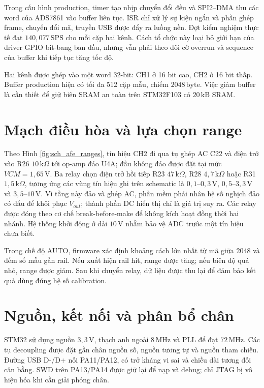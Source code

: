 \documentclass[12pt,a4paper]{report}
\newcommand{\unit}[1]{\,\mathrm{#1}}
\begin{document}
Trong cấu hình production, timer tạo nhịp chuyển đổi đều và SPI2--DMA thu các word của ADS7861 vào buffer liên tục. ISR chỉ xử lý sự kiện ngắn và phần ghép frame, chuyển đổi mã, truyền USB được đẩy ra luồng nền. Đợt kiểm nghiệm thực tế đạt $140{,}077\unit{SPS}$ cho mỗi cặp hai kênh. Cách tổ chức này loại bỏ giới hạn của driver GPIO bit-bang ban đầu, nhưng vẫn phải theo dõi cờ overrun và sequence của buffer khi tiếp tục tăng tốc độ.

Hai kênh được ghép vào một word 32-bit: CH1 ở 16 bit cao, CH2 ở 16 bit thấp. Buffer production hiện có tối đa 512 cặp mẫu, chiếm $2048\unit{byte}$. Việc giảm buffer là cần thiết để giữ biên SRAM an toàn trên STM32F103 có $20\unit{kB}$ SRAM.

\section{Mạch điều hòa và lựa chọn range}
Theo Hình \ref{fig:sch_afe_ranges}, tín hiệu CH2 đi qua tụ ghép AC C22 và điện trở vào R26 $10\,\mathrm{k}\Omega$ tới op-amp đảo U4A; đầu không đảo được đặt tại mức $VCM=1{,}65\unit{V}$. Ba relay chọn điện trở hồi tiếp R23 $47\,\mathrm{k}\Omega$, R28 $4{,}7\,\mathrm{k}\Omega$ hoặc R31 $1{,}5\,\mathrm{k}\Omega$, tương ứng các vùng tín hiệu ghi trên schematic là $0{,}1$--$0{,}3\unit{V}$, $0{,}5$--$3{,}3\unit{V}$ và $3{,}5$--$10\unit{V}$. Vì tầng này đảo và ghép AC, phần mềm phải nhân hệ số nghịch đảo có dấu để khôi phục $V_{out}$; thành phần DC hiển thị chỉ là giá trị suy ra. Các relay được đóng theo cơ chế break-before-make để không kích hoạt đồng thời hai nhánh. Hệ thống khởi động ở dải $10\unit{V}$ nhằm bảo vệ ADC trước một tín hiệu chưa biết.

Trong chế độ AUTO, firmware xác định khoảng cách lớn nhất từ mã giữa 2048 và đếm số mẫu gần rail. Nếu xuất hiện rail hit, range được tăng; nếu biên độ quá nhỏ, range được giảm. Sau khi chuyển relay, dữ liệu được thu lại để đảm bảo kết quả dùng đúng hệ số calibration.

\section{Nguồn, kết nối và phân bổ chân}
STM32 sử dụng nguồn $3{,}3\unit{V}$, thạch anh ngoài $8\unit{MHz}$ và PLL để đạt $72\unit{MHz}$. Các tụ decoupling được đặt gần chân nguồn số, nguồn tương tự và nguồn tham chiếu. Đường USB D-/D+ nối PA11/PA12, có trở kháng vi sai và chiều dài tương đối cân bằng. SWD trên PA13/PA14 được giữ lại để nạp và debug; chỉ JTAG bị vô hiệu hóa khi cần giải phóng chân.
\end{document}
